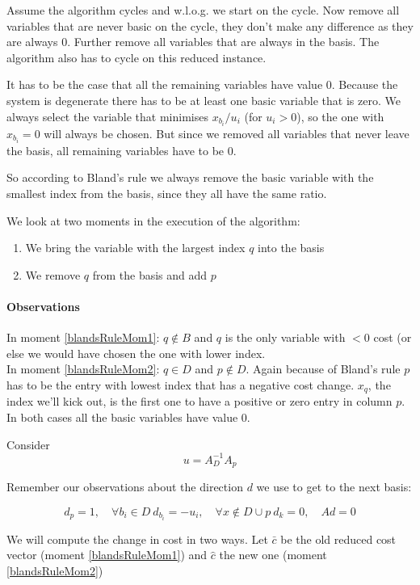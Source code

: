 \begin{pr} Assume the algorithm cycles and w.l.o.g. we start on the cycle. Now remove all variables that are never basic on the cycle, they don't make any difference as they are always 0. Further remove all variables that are always in the basis. The algorithm also has to cycle on this reduced instance. 

It has to be the case that all the remaining variables have value 0. Because the system is degenerate there has to be at least one basic variable that is zero. We always select the variable that minimises $x_{b_i}/u_i$ (for $u_i>0$), so the one with $x_{b_i}=0$ will always be chosen. But since we removed all variables that never leave the basis, all remaining variables have to be 0. 

So according to Bland's rule we always remove the basic variable with the smallest index from the basis, since they all have the same ratio.

We look at two moments in the execution of the algorithm:

\begin{enumerate}
\item \label{blandsRuleMom1} We bring the variable with the largest index $q$ into the basis
\item \label{blandsRuleMom2} We remove $q$ from the basis and add $p$
\end{enumerate}

\paragraph{Observations} In moment \ref{blandsRuleMom1}: $q\not \in B$ and $q$ is the only variable with $<0$ cost (or else we would have chosen the one with lower index. \\
In moment \ref{blandsRuleMom2}: $q\in D$ and $p\not \in D$. Again because of Bland's rule $p$ has to be the entry with lowest index that has a negative cost change. $x_q$, the index we'll kick out, is the first one to have a positive or zero entry in column $p$. In both cases all the basic variables have value 0. %

Consider 
\[u=A_D^{-1}A_p\]

Remember our observations about the direction $d$ we use to get to the next basis:

\[d_p =1, \quad \forall b_i \in D\ d_{b_i} = -u_i, \quad \forall x\not \in D\cup p\ d_k=0, \quad Ad=0\]

We will compute the  change in cost in two ways. Let $\bar c$ be the old reduced cost vector (moment \ref{blandsRuleMom1}) and $\hat c$ the new one (moment \ref{blandsRuleMom2})


\end{pr}

